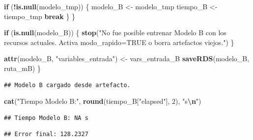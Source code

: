 \documentclass[
]{article}
\newenvironment{Shaded}{\begin{snugshade}}{\end{snugshade}}
\newcommand{\ControlFlowTok}[1]{\textcolor[rgb]{0.13,0.29,0.53}{\textbf{#1}}}
\newcommand{\DecValTok}[1]{\textcolor[rgb]{0.00,0.00,0.81}{#1}}
\newcommand{\FunctionTok}[1]{\textcolor[rgb]{0.13,0.29,0.53}{\textbf{#1}}}
\newcommand{\NormalTok}[1]{#1}
\newcommand{\OtherTok}[1]{\textcolor[rgb]{0.56,0.35,0.01}{#1}}
\newcommand{\SpecialCharTok}[1]{\textcolor[rgb]{0.81,0.36,0.00}{\textbf{#1}}}
\newcommand{\StringTok}[1]{\textcolor[rgb]{0.31,0.60,0.02}{#1}}
\begin{document}
\begin{Shaded}
\begin{Highlighting}[]
    \ControlFlowTok{if}\NormalTok{ (}\SpecialCharTok{!}\FunctionTok{is.null}\NormalTok{(modelo\_tmp)) \{}
\NormalTok{      modelo\_B }\OtherTok{\textless{}{-}}\NormalTok{ modelo\_tmp}
\NormalTok{      tiempo\_B }\OtherTok{\textless{}{-}}\NormalTok{ tiempo\_tmp}
      \ControlFlowTok{break}
\NormalTok{    \}}
\NormalTok{  \}}

  \ControlFlowTok{if}\NormalTok{ (}\FunctionTok{is.null}\NormalTok{(modelo\_B)) \{}
    \FunctionTok{stop}\NormalTok{(}\StringTok{"No fue posible entrenar Modelo B con los recursos actuales. Activa modo\_rapido=TRUE o borra artefactos viejos."}\NormalTok{)}
\NormalTok{  \}}

  \FunctionTok{attr}\NormalTok{(modelo\_B, }\StringTok{"variables\_entrada"}\NormalTok{) }\OtherTok{\textless{}{-}}\NormalTok{ vars\_entrada\_B}
  \FunctionTok{saveRDS}\NormalTok{(modelo\_B, ruta\_mB)}
\NormalTok{\}}
\end{Highlighting}
\end{Shaded}

\begin{verbatim}
## Modelo B cargado desde artefacto.
\end{verbatim}

\begin{Shaded}
\begin{Highlighting}[]
\FunctionTok{cat}\NormalTok{(}\StringTok{"Tiempo Modelo B:"}\NormalTok{, }\FunctionTok{round}\NormalTok{(tiempo\_B[}\StringTok{"elapsed"}\NormalTok{], }\DecValTok{2}\NormalTok{), }\StringTok{"s}\SpecialCharTok{\textbackslash{}n}\StringTok{"}\NormalTok{)}
\end{Highlighting}
\end{Shaded}

\begin{verbatim}
## Tiempo Modelo B: NA s
\end{verbatim}

\begin{Shaded}
\end{Shaded}

\begin{verbatim}
## Error final: 128.2327
\end{verbatim}
\end{document}

